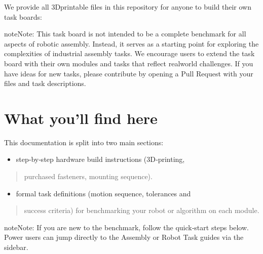 \documentclass[letterpaper,10pt,english]{sphinxmanual}
\begin{document}
\sphinxAtStartPar
We provide all 3D\sphinxhyphen{}printable files in this repository for anyone to build their own task boards: 

\begin{sphinxadmonition}{note}{Note:}
\sphinxAtStartPar
This task board is not intended to be a complete benchmark for all aspects of robotic assembly.
Instead, it serves as a starting point for exploring the complexities of industrial assembly tasks.
We encourage users to extend the task board with their own modules and tasks that reflect real\sphinxhyphen{}world challenges.
If you have ideas for new tasks, please contribute by opening a Pull Request with your files and task descriptions.
\end{sphinxadmonition}


\chapter{What you’ll find here}
\label{\detokenize{index:what-youll-find-here}}
\sphinxAtStartPar
This documentation is split into two main sections:
\begin{itemize}
\item {} 
\sphinxAtStartPar
{} \textendash{} step‑by‑step hardware build instructions (3D‑printing,

\end{itemize}
\begin{quote}

\sphinxAtStartPar
purchased fasteners, mounting sequence).
\end{quote}
\begin{itemize}
\item {} 
\sphinxAtStartPar
{} \textendash{} formal task definitions (motion sequence, tolerances and

\end{itemize}
\begin{quote}

\sphinxAtStartPar
success criteria) for benchmarking your robot or algorithm on each module.
\end{quote}

\begin{sphinxadmonition}{note}{Note:}
\sphinxAtStartPar
If you are new to the benchmark, follow the quick‑start steps below. Power
users can jump directly to the Assembly or Robot Task guides via the sidebar.
\end{sphinxadmonition}
\end{document}
